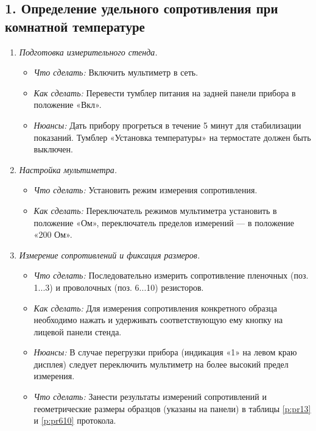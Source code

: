 \subsection*{1. Определение удельного сопротивления при комнатной температуре}
\begin{enumerate}
    \item \textit{Подготовка измерительного стенда.}
    \begin{itemize}
        \item \textit{Что сделать:} Включить мультиметр в сеть.
        \item \textit{Как сделать:} Перевести тумблер питания на задней панели прибора в положение «Вкл».
        \item \textit{Нюансы:} Дать прибору прогреться в течение 5 минут для стабилизации показаний. Тумблер «Установка температуры» на термостате должен быть выключен.
    \end{itemize}
    \item \textit{Настройка мультиметра.}
    \begin{itemize}
        \item \textit{Что сделать:} Установить режим измерения сопротивления.
        \item \textit{Как сделать:} Переключатель режимов мультиметра установить в положение «Ом», переключатель пределов измерений — в положение «200 Ом».
    \end{itemize}
    \item \textit{Измерение сопротивлений и фиксация размеров.}
    \begin{itemize}
        \item \textit{Что сделать:} Последовательно измерить сопротивление пленочных (поз. 1...3) и проволочных (поз. 6...10) резисторов.
        \item \textit{Как сделать:} Для измерения сопротивления конкретного образца необходимо нажать и удерживать соответствующую ему кнопку на лицевой панели стенда.
        \item \textit{Нюансы:} В случае перегрузки прибора (индикация «1» на левом краю дисплея) следует переключить мультиметр на более высокий предел измерения.
        \item \textit{Что сделать:} Занести результаты измерений сопротивлений и геометрические размеры образцов (указаны на панели) в таблицы \cref{p:pr13} и \cref{p:pr610} протокола.
    \end{itemize}
\end{enumerate}

